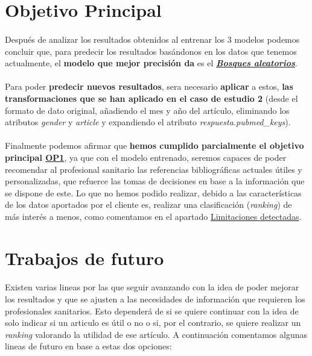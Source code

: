 \section{Objetivo Principal}

\paragraph{}
Después de analizar los resultados obtenidos al entrenar los 3 modelos podemos concluir que, para predecir los resultados basándonos en los datos que tenemos actualmente, el \textbf{modelo que mejor precisión da} es el \hyperref[table:comparative]{\textbf{\textit{Bosques aleatorios}}}.

\paragraph{}
Para poder \textbf{predecir nuevos resultados}, sera necesario \textbf{aplicar} a estos, \textbf{las transformaciones que se han aplicado en el caso de estudio 2} (desde el formato de dato original, añadiendo el mes y año del artículo, eliminando los atributos \textit{gender} y \textit{article} y expandiendo el atributo \textit{respuesta.pubmed\_keys}).

\paragraph{}
Finalmente podemos afirmar que \textbf{hemos cumplido parcialmente el objetivo principal \hyperref[op:OP1]{OP1}}, ya que con el modelo entrenado, seremos capaces de poder recomendar al profesional sanitario las referencias bibliográficas actuales útiles y personalizadas, que refuerce las tomas de decisiones en base a la información que se dispone de este. Lo que no hemos podido realizar, debido a las características de los datos aportados por el cliente es, realizar una clasificación (\textit{ranking}) de más interés a menos, como comentamos en el apartado \hyperref[section:limit]{Limitaciones detectadas}.

\section{Trabajos de futuro}

\paragraph{}
Existen varias lineas por las que seguir avanzando con la idea de poder mejorar los resultados y que se ajusten a las necesidades de información que requieren los profesionales sanitarios. Esto dependerá de si se quiere continuar con la idea de solo indicar si un articulo es útil o no o si, por el contrario, se quiere realizar un \textit{ranking} valorando la utilidad de ese artículo. A continuación comentamos algunas lineas de futuro en base a estas dos opciones:


